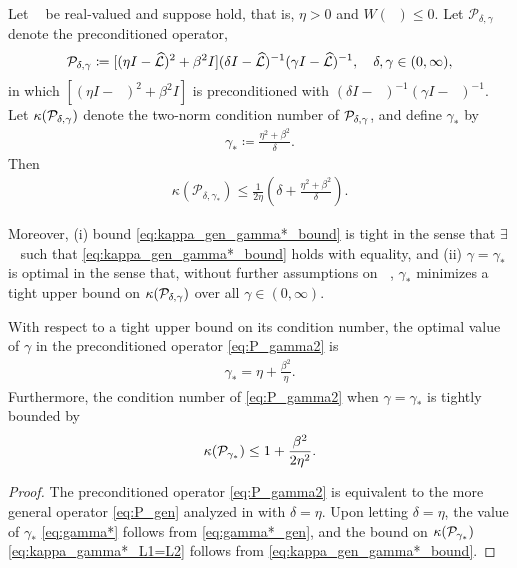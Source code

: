 \documentclass[review]{siamart}
\DeclareMathOperator{\cL}{\widehat{\mathcal{L}}}
\begin{document}
\begin{theorem}[Optimal preconditioning, $\cL_1 = \cL_2$ \cite{irk1}]
\label{th:cond_L1=L2}
Let $\cL$ be real-valued and suppose  hold,
that is, $\eta > 0$ and $W(\cL) \leq 0$. Let $\mathcal{P}_{\delta,\gamma}$ denote
the preconditioned operator,
\begin{align} \label{eq:P_gen}
{\cal P}_{\delta, \gamma} \coloneqq [(\eta I  - \cL)^2 + \beta^2 I]
	(\delta I - \cL)^{-1} (\gamma I - \cL)^{-1}, \quad \delta, \gamma \in (0, \infty),
\end{align}
in which $[(\eta I  - \cL)^2 + \beta^2 I]$ is preconditioned with $(\delta I - \cL)^{-1} (\gamma I - \cL)^{-1}$.
%
Let $\kappa({\cal P}_{\delta, \gamma})$ denote the two-norm condition number of ${\cal P}_{\delta,\gamma}$,
and define $\gamma_*$ by
\begin{align} \label{eq:gamma*_gen}
\gamma_* \coloneqq \frac{\eta^2+\beta^2}{\delta}.
\end{align}
Then
\begin{align} \label{eq:kappa_gen_gamma*_bound}
\kappa(\mathcal{P}_{\delta, \gamma_*}) \leq \frac{1}{2 \eta} \left( \delta + \frac{\eta^2 + \beta^2}{\delta} \right).
\end{align}

Moreover, (i) bound \eqref{eq:kappa_gen_gamma*_bound} is tight in the sense that $\exists$ $\cL$
such that \eqref{eq:kappa_gen_gamma*_bound} holds with equality, and (ii) $\gamma = \gamma_*$ is optimal
in the sense that, without further assumptions on $\cL$, $\gamma_*$ minimizes a tight
upper bound on $\kappa({\cal P}_{\delta, \gamma})$ over all $\gamma \in (0, \infty)$.
\end{theorem}

\begin{corollary}
\label{col:cond_L1=L2}
With respect to a tight upper bound on its condition number, the optimal value of $\gamma$ in the preconditioned operator \eqref{eq:P_gamma2} is
\begin{align} \label{eq:gamma*}
\gamma_* =  \eta + \frac{\beta^2}{\eta}.
\end{align}
Furthermore, the condition number of \eqref{eq:P_gamma2} when $\gamma = \gamma_*$ is tightly bounded by
\begin{align} \label{eq:kappa_gamma*_L1=L2}
\kappa({\cal P}_{\gamma_*}) \leq  1 +  \frac{\beta^2}{2\eta^2}.
\end{align}
\end{corollary}
\begin{proof}
The preconditioned operator \eqref{eq:P_gamma2} is equivalent to the more general operator \eqref{eq:P_gen} analyzed in  with $\delta = \eta$. Upon letting $\delta = \eta$, the value of $\gamma_*$ \eqref{eq:gamma*} follows from \eqref{eq:gamma*_gen}, and the bound on $\kappa({\cal P}_{\gamma_*})$ \eqref{eq:kappa_gamma*_L1=L2} follows from \eqref{eq:kappa_gen_gamma*_bound}.
\end{proof}
\end{document}
